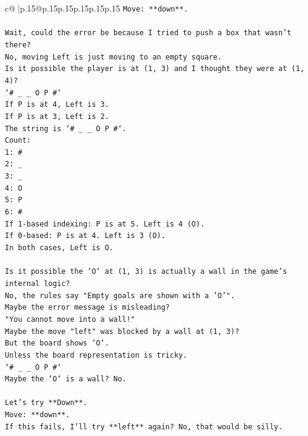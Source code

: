 \documentclass{article}
\begin{document}
{\begin{supertabular}{c@{$\;$}|p{.15\linewidth}@{}p{.15\linewidth}p{.15\linewidth}p{.15\linewidth}p{.15\linewidth}p{.15\linewidth}}
{{{\texttt{Move: **down**.} \\
\\ 
\texttt{Wait, could the error be because I tried to push a box that wasn't there?} \\
\texttt{No, moving Left is just moving to an empty square.} \\
\texttt{Is it possible the player is at (1, 3) and I thought they were at (1, 4)?} \\
\texttt{`\# \_ \_ O P \#`} \\
\texttt{If P is at 4, Left is 3.} \\
\texttt{If P is at 3, Left is 2.} \\
\texttt{The string is `\# \_ \_ O P \#`.} \\
\texttt{Count:} \\
\texttt{1: \#} \\
\texttt{2: \_} \\
\texttt{3: \_} \\
\texttt{4: O} \\
\texttt{5: P} \\
\texttt{6: \#} \\
\texttt{If 1{-}based indexing: P is at 5. Left is 4 (O).} \\
\texttt{If 0{-}based: P is at 4. Left is 3 (O).} \\
\texttt{In both cases, Left is O.} \\
\\ 
\texttt{Is it possible the `O` at (1, 3) is actually a wall in the game's internal logic?} \\
\texttt{No, the rules say "Empty goals are shown with a 'O'".} \\
\texttt{Maybe the error message is misleading?} \\
\texttt{"You cannot move into a wall!"} \\
\texttt{Maybe the move "left" was blocked by a wall at (1, 3)?} \\
\texttt{But the board shows `O`.} \\
\texttt{Unless the board representation is tricky.} \\
\texttt{`\# \_ \_ O P \#`} \\
\texttt{Maybe the `O` is a wall? No.} \\
\\ 
\texttt{Let's try **Down**.} \\
\texttt{Move: **down**.} \\
\texttt{If this fails, I'll try **left** again? No, that would be silly.} \\
}}}
\end{supertabular}}
\end{document}
